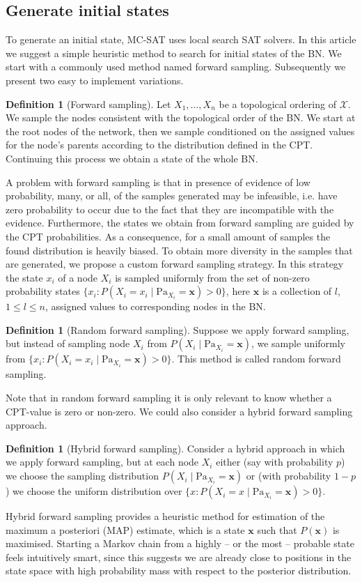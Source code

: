 \documentclass[a4paper, twoside, 11pt]{report}
\theoremstyle{plain}
\theoremstyle{definition}
\newtheorem{definition}[thm]{Definition}
\theoremstyle{remark}
\newcommand{\X}{{\mathcal{X}}}
\newcommand{\bfx}{{\mathbf{x}}}
\begin{document}
\subsection{Generate initial states}
To generate an initial state, MC-SAT uses local search SAT solvers. In this article we suggest a simple heuristic method to search for initial states of the BN. We start with a commonly used method named forward sampling. Subsequently we present two easy to implement variations.
\begin{definition}[Forward sampling]
Let $X_1, \ldots , X_n$ be a topological ordering of $\X$. We sample the nodes consistent with the topological order of the BN. We start at the root nodes of the network, then we sample conditioned on the assigned values for the node's parents according to the distribution defined in the CPT. Continuing this process we obtain a state of the whole BN.
\end{definition}
A problem with forward sampling is that in presence of evidence of low probability, many, or all, of the samples generated may be infeasible, i.e. have zero probability to occur due to the fact that they are incompatible with the evidence. Furthermore, the states we obtain from forward sampling are guided by the CPT probabilities. As a consequence, for a small amount of samples the found distribution is heavily biased. To obtain more diversity in the samples that are generated, we propose a custom forward sampling strategy. In this strategy the state $x_i$ of a node $X_i$ is sampled uniformly from the set of non-zero probability states $\{x_i : P(X_i = x_i \mid \text{Pa}_{X_i}=\mathbf{x}) > 0\}$, here $\bfx$ is a collection of $l$,  $1\leq l \leq n$, assigned values to corresponding nodes in the BN. 

\begin{definition}[Random forward sampling]
Suppose we apply forward sampling, but instead of sampling node $X_i$ from $P(X_i \mid \text{Pa}_{X_i} = \mathbf{x})$, we sample uniformly from $\{x_i : P(X_i = x_i \mid \text{Pa}_{X_i}=\mathbf{x}) > 0\}$. This method is called {random forward sampling}.
\end{definition}
Note that in random forward sampling it is only relevant to know whether a CPT-value is zero or non-zero. We could also consider a hybrid forward sampling approach. 
\begin{definition}[Hybrid forward sampling]
Consider a hybrid approach in which we apply forward sampling, but at each node $X_i$ either (say with probability $p$) we choose the sampling distribution $P(X_i \mid \text{Pa}_{X_i} = \mathbf{x})$ or (with probability $1-p$) we choose the uniform distribution over $\{x : P(X_i = x \mid \text{Pa}_{X_i}=\mathbf{x}) > 0\}$. 
\end{definition}
Hybrid forward sampling provides a heuristic method for estimation of the maximum a posteriori (MAP) estimate, which is a state $\bfx$ such that $P(\bfx)$ is maximised. Starting a Markov chain from a highly -- or the most -- probable state feels intuitively smart, since this suggests we are already close to positions in the state space with high probability mass with respect to the posterior distribution.
\end{document}

